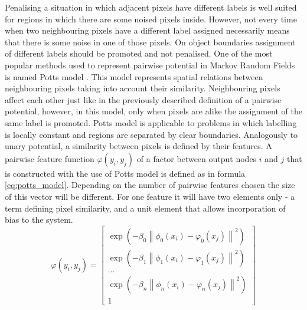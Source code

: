 Penalising a situation in which adjacent pixels have different labels is well suited for regions in which there are some noised pixels inside. However, not every time when two neighbouring pixels have a different label assigned necessarily means that there is some noise in one of those pixels. On object boundaries assignment of different labels should be promoted and not penalised. One of the most popular methods used to represent pairwise potential in Markov Random Fields is named Potts model \cite{potts_model}. This model represents spatial relations between neighbouring pixels taking into account their similarity. Neighbouring pixels affect each other just like in the previously described definition of a pairwise potential, however, in this model, only when pixels are alike the assignment of the same label is promoted. Potts model is applicable to problems in which labelling is locally constant and regions are separated by clear boundaries. Analogously to unary potential, a similarity between pixels is defined by their features. A pairwise feature function $\varphi(y_i,y_j)$ of a factor between output nodes $i$ and $j$ that is constructed with the use of Potts model is defined as in formula \ref{eq:potts_model}. Depending on the number of pairwise features chosen the size of this vector will be different. For one feature it will have two elements only - a term defining pixel similarity, and a unit element that allows incorporation of bias to the system.
\begin{equation}
    \label{eq:potts_model}
    \varphi(y_i,y_j) = \begin{bmatrix}
        \exp{(-\beta_0 \left \| \phi_0(x_i) - \varphi_0(x_j)\right \|^2)} \\
        \exp{(-\beta_1 \left \| \phi_1(x_i) - \varphi_1(x_j)\right \|^2)} \\
        ...             \\
        \exp{(-\beta_n \left \| \phi_n(x_i) - \varphi_n(x_j)\right \|^2)} \\
        1
    \end{bmatrix}
\end{equation}

